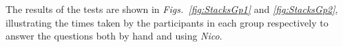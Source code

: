\documentclass[12pt,twoside,notitlepage,xetex]{report}
\begin{document}
The results of the tests are shown in \emph{Figs.~\ref{fig:StacksGp1}} and \emph{\ref{fig:StacksGp2}}, illustrating the times taken by the participants in each group respectively to answer the questions both by hand and using \emph{Nico}.

\end{document}
